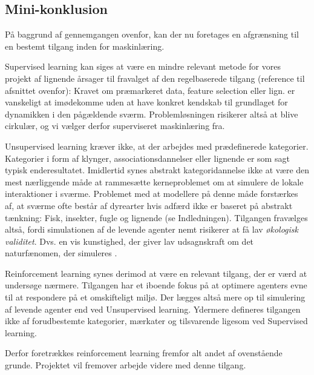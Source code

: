 \subsection{Mini-konklusion}
På baggrund af gennemgangen ovenfor, kan der nu foretages en afgrænsning til en bestemt tilgang inden for maskinlæring. %
\par
Supervised learning kan siges at være en mindre relevant metode for vores projekt af lignende årsager til fravalget af den regelbaserede tilgang (reference til afsnittet ovenfor): Kravet om præmarkeret data, feature selection eller lign. er vanskeligt at imødekomme uden at have konkret kendskab til grundlaget for dynamikken i den pågældende sværm. Problemløsningen risikerer altså at blive cirkulær, og vi vælger derfor superviseret maskinlæring fra. %
\par
Unsupervised learning kræver ikke, at der arbejdes med prædefinerede kategorier. Kategorier i form af klynger, associationsdannelser eller lignende er som sagt typisk enderesultatet. Imidlertid synes abstrakt kategoridannelse ikke at være den mest nærliggende måde at rammesætte kerneproblemet om at simulere de lokale interaktioner i sværme. Problemet med at modellere på denne måde forstærkes af, at sværme ofte består af dyrearter hvis adfærd ikke er baseret på abstrakt tænkning: Fisk, insekter, fugle og lignende (se Indledningen). %
Tilgangen fravælges altså, fordi simulationen af de levende agenter nemt risikerer at få lav \textit{økologisk validitet}. Dvs. en vis kunstighed, der giver lav udsagnskraft om det naturfænomen, der simuleres \cite{brewer2014}.
\par
Reinforcement learning synes derimod at være en relevant tilgang, der er værd at undersøge nærmere. Tilgangen har et iboende fokus på at optimere agenters evne til at respondere på et omskifteligt miljø. Der lægges altså mere op til simulering af levende agenter end ved Unsupervised learning. Ydermere defineres tilgangen ikke af forudbestemte kategorier, mærkater og tilsvarende ligesom ved Supervised learning. 
\par
Derfor foretrækkes reinforcement learning fremfor alt andet af ovenstående grunde. Projektet vil fremover arbejde videre med denne tilgang. %

